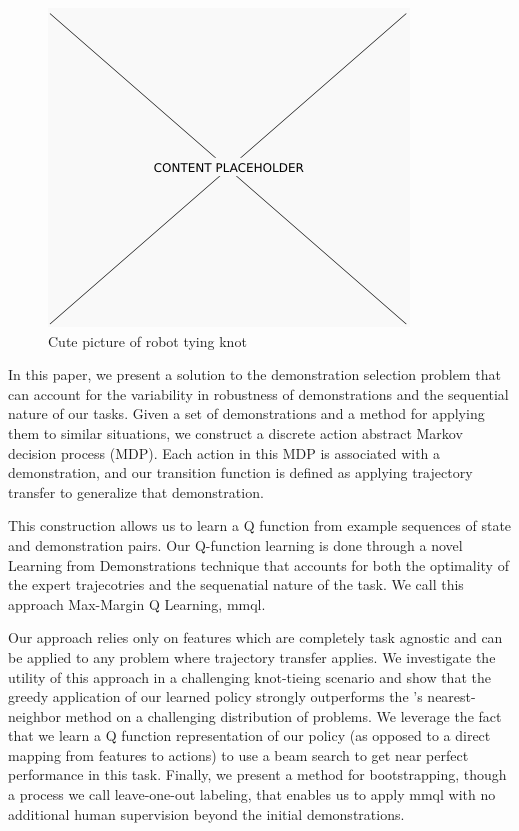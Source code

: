 \begin{figure}[t]
  \centering
    \includegraphics[width=0.9\linewidth]{figures/placeholder.png}
  \caption{Cute picture of robot tying knot}
  \label{fig:frontfig}
\end{figure}

In this paper, we present a solution to the demonstration selection problem that
can account for the variability in robustness of demonstrations and the
sequential nature of our tasks.  Given a set of demonstrations and a method for
applying them to similar situations, we construct a discrete action abstract
Markov decision process (MDP).  Each action in this MDP is associated with a
demonstration, and our transition function is defined as applying trajectory
transfer to generalize that demonstration.

This construction allows us to learn a Q function from example sequences of 
state and demonstration pairs.
Our Q-function learning is done through a novel Learning from Demonstrations
technique that accounts for both the optimality of the expert trajecotries and the
sequenatial nature of the task.
We call this approach Max-Margin Q Learning, {\sc mmql}.

Our approach relies only on features which are completely task 
agnostic and can be applied to any problem where trajectory transfer applies. 
We investigate the utility of this approach in a challenging knot-tieing scenario 
and show that the greedy application of our learned policy strongly outperforms the 
\citet{Schulmanetal_ISRR2013}'s nearest-neighbor method on a challenging distribution of 
problems. 
We leverage the fact that we learn a Q function representation of our policy (as 
opposed to a direct mapping from features to actions) to use a beam search to get 
near perfect performance in this task.
Finally, we present a method for bootstrapping, though a process we call leave-one-out labeling, that enables us to apply {\sc mmql} with no additional human supervision beyond the initial demonstrations.

